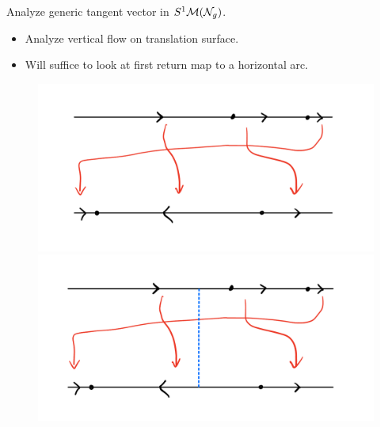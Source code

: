 \begin{frame}
  \begin{goal}
    Analyze generic tangent vector in $S^1 \mathcal{M}(\mathcal{N}_g)$.
  \end{goal}
  \begin{itemize}
  \item<2-> Analyze vertical flow on translation surface.
  \item<3-> Will suffice to look at first return map to a horizontal arc.
  \end{itemize}
    \begin{figure}[h]
      \begin{overprint}
      \centering
      \includegraphics[scale=0.2]{ietwf.png}
      \includegraphics[scale=0.2]{ietwf2.png}
      \end{overprint}
    \end{figure}

\end{frame}

